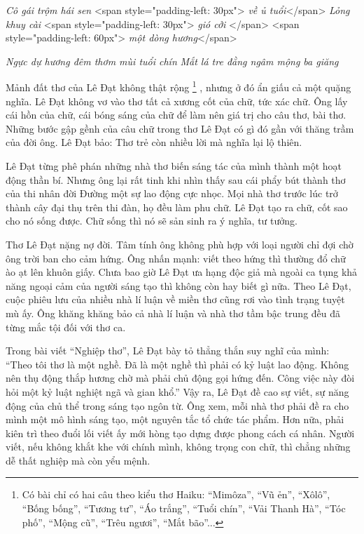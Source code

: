 \documentclass[../main.tex]{subfiles}
\begin{document}
\begin{multicols}{2}
\begin{blockquote}
\textit{Cô gái trộm hái sen }        
<span style="padding-left: 30px">\textit{   		về ủ tuổi}</span> 
\textit{Lỏng khuy cài } 
<span style="padding-left: 30px">\textit{   		 gió cởi }</span> 
<span style="padding-left: 60px">\textit{     			một dòng hương}</span> 
        
\textit{Ngực dự hương đêm thơm mùi tuổi chín }        
\textit{Mắt lá tre đằng ngâm mộng ba giăng} 

\end{blockquote}
 
Mảnh đất thơ của Lê Đạt không thật rộng \footnote{
Có bài chỉ có hai câu theo kiểu thơ Haiku: “Mimôza”, “Vũ ẻn”, “Xôlô”, “Bống bống”, “Tương tư”, “Áo trắng”, “Tuổi chín”, “Vải Thanh Hà”, “Tóc phố”, “Mộng cũ”, “Trêu ngươi”, “Mắt bão”...} , nhưng ở đó ẩn giấu cả một quặng nghĩa. Lê Đạt không vơ vào thơ tất cả xương cốt của chữ, tức xác chữ. Ông lấy cái hồn của chữ, cái bóng sáng của chữ để làm nên giá trị cho câu thơ, bài thơ. Những bước gập gềnh của câu chữ trong thơ Lê Đạt có gì đó gần với thăng trầm của đời ông. Lê Đạt bảo: Thơ trẻ còn nhiều lời mà nghĩa lại lộ thiên. 
 
Lê Đạt từng phê phán những nhà thơ biến sáng tác của mình thành một hoạt động thần bí. Nhưng ông lại rất tinh khi nhìn thấy sau cái phẩy bút thành thơ của thi nhân đời Đường một sự lao động cực nhọc. Mọi nhà thơ trước lúc trở thành cây đại thụ trên thi đàn, họ đều làm phu chữ. Lê Đạt tạo ra chữ, cốt sao cho nó sống được. Chữ sống thì nó sẽ sản sinh ra ý nghĩa, tư tưởng. 
 
Thơ Lê Đạt nặng nợ đời. Tâm tính ông không phù hợp với loại người chỉ đợi chờ ông trời ban cho cảm hứng. Ông nhấn mạnh: viết theo hứng thì thường đổ chữ ào ạt lên khuôn giấy. Chưa bao giờ Lê Đạt ưa hạng độc giả mà ngoài ca tụng khả năng ngoại cảm của người sáng tạo thì không còn hay biết gì nữa. Theo Lê Đạt, cuộc phiêu lưu của nhiều nhà lí luận về miền thơ cũng rơi vào tình trạng tuyệt mù ấy. Ông khăng khăng bảo cả nhà lí luận và nhà thơ tầm bậc trung đều đã từng mắc tội đối với thơ ca. 
 
Trong bài viết “Nghiệp thơ”, Lê Đạt bày tỏ thẳng thắn suy nghĩ của mình: “Theo tôi thơ là một nghề. Đã là một nghề thì phải có kỷ luật lao động. Không nên thụ động thắp hương chờ mà phải chủ động gọi hứng đến. Công việc này đòi hỏi một kỷ luật nghiệt ngã và gian khổ.” Vậy ra, Lê Đạt đề cao sự viết, sự năng động của chủ thể trong sáng tạo ngôn từ. Ông xem, mỗi nhà thơ phải đề ra cho mình một mô hình sáng tạo, một nguyên tắc tổ chức tác phẩm. Hơn nữa, phải kiên trì theo đuổi lối viết ấy mới hòng tạo dựng được phong cách cá nhân. Người viết, nếu không khắt khe với chính mình, không trọng con chữ, thì chẳng những dễ thất nghiệp mà còn yểu mệnh. 
 

\end{multicols}
\end{document}
